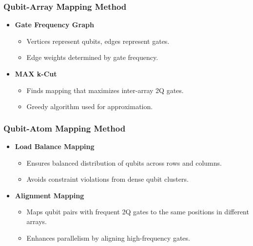 \documentclass[18 pt]{beamer}
\begin{document}
\begin{frame}
    \frametitle{Qubit-Array Mapping Method}
    \begin{itemize}
        \item \textbf{Gate Frequency Graph}
        \begin{itemize}
            \item Vertices represent qubits, edges represent gates.
            \item Edge weights determined by gate frequency.
        \end{itemize}
        \item \textbf{MAX k-Cut}
        \begin{itemize}
            \item Finds mapping that maximizes inter-array 2Q gates.
            \item Greedy algorithm used for approximation.
        \end{itemize}
    \end{itemize}
\end{frame}

\begin{frame}
    \frametitle{Qubit-Atom Mapping Method}
    \begin{itemize}
        \item \textbf{Load Balance Mapping}
        \begin{itemize}
            \item Ensures balanced distribution of qubits across rows and columns.
            \item Avoids constraint violations from dense qubit clusters.
        \end{itemize}
        \item \textbf{Alignment Mapping}
        \begin{itemize}
            \item Maps qubit pairs with frequent 2Q gates to the same positions in different arrays.
            \item Enhances parallelism by aligning high-frequency gates.
        \end{itemize}
    \end{itemize}
\end{frame}
\end{document}
